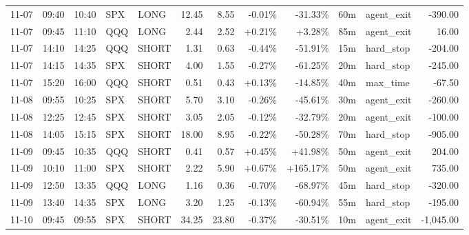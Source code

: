 \documentclass[11pt,a4paper,twoside]{article}
\begin{document}
\begin{center}
\begin{longtable}{>{\color{txtmain}}l l l l l r r r r r >{\color{txtmain}}l r}
11-07 & 09:40 & 10:40 & SPX & LONG & 12.45 & 8.55 & \textcolor{lossred}{-0.01\%} & \textcolor{lossred}{-31.33\%} & 60m & agent\_exit & \textcolor{lossred}{-390.00} \\
11-07 & 09:45 & 11:10 & QQQ & LONG & 2.44 & 2.52 & \textcolor{wingreen}{+0.21\%} & \textcolor{wingreen}{+3.28\%} & 85m & agent\_exit & \textcolor{wingreen}{16.00} \\
11-07 & 14:10 & 14:25 & QQQ & SHORT & 1.31 & 0.63 & \textcolor{lossred}{-0.44\%} & \textcolor{lossred}{-51.91\%} & 15m & hard\_stop & \textcolor{lossred}{-204.00} \\
11-07 & 14:15 & 14:35 & SPX & SHORT & 4.00 & 1.55 & \textcolor{lossred}{-0.27\%} & \textcolor{lossred}{-61.25\%} & 20m & hard\_stop & \textcolor{lossred}{-245.00} \\
11-07 & 15:20 & 16:00 & QQQ & SHORT & 0.51 & 0.43 & \textcolor{wingreen}{+0.13\%} & \textcolor{lossred}{-14.85\%} & 40m & max\_time & \textcolor{lossred}{-67.50} \\
11-08 & 09:55 & 10:25 & SPX & SHORT & 5.70 & 3.10 & \textcolor{lossred}{-0.26\%} & \textcolor{lossred}{-45.61\%} & 30m & agent\_exit & \textcolor{lossred}{-260.00} \\
11-08 & 12:25 & 12:45 & SPX & SHORT & 3.05 & 2.05 & \textcolor{lossred}{-0.12\%} & \textcolor{lossred}{-32.79\%} & 20m & agent\_exit & \textcolor{lossred}{-100.00} \\
11-08 & 14:05 & 15:15 & SPX & SHORT & 18.00 & 8.95 & \textcolor{lossred}{-0.22\%} & \textcolor{lossred}{-50.28\%} & 70m & hard\_stop & \textcolor{lossred}{-905.00} \\
11-09 & 09:45 & 10:35 & QQQ & SHORT & 0.41 & 0.57 & \textcolor{wingreen}{+0.45\%} & \textcolor{wingreen}{+41.98\%} & 50m & agent\_exit & \textcolor{wingreen}{204.00} \\
11-09 & 10:10 & 11:00 & SPX & SHORT & 2.22 & 5.90 & \textcolor{wingreen}{+0.67\%} & \textcolor{wingreen}{+165.17\%} & 50m & agent\_exit & \textcolor{wingreen}{735.00} \\
11-09 & 12:50 & 13:35 & QQQ & LONG & 1.16 & 0.36 & \textcolor{lossred}{-0.70\%} & \textcolor{lossred}{-68.97\%} & 45m & hard\_stop & \textcolor{lossred}{-320.00} \\
11-09 & 13:40 & 14:35 & SPX & LONG & 3.20 & 1.25 & \textcolor{lossred}{-0.13\%} & \textcolor{lossred}{-60.94\%} & 55m & hard\_stop & \textcolor{lossred}{-195.00} \\
11-10 & 09:45 & 09:55 & SPX & SHORT & 34.25 & 23.80 & \textcolor{lossred}{-0.37\%} & \textcolor{lossred}{-30.51\%} & 10m & agent\_exit & \textcolor{lossred}{-1,045.00} \\

\end{longtable}
\end{center}
\end{document}
